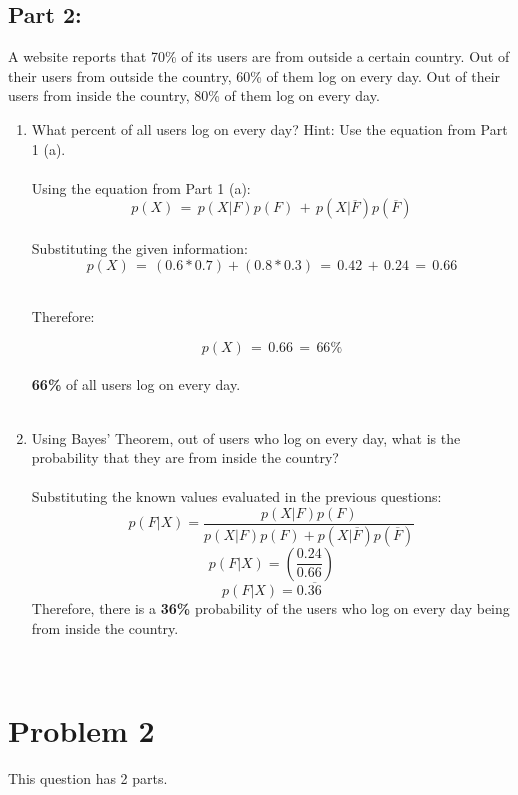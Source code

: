\documentclass{amsart}
\theoremstyle{definition}
\theoremstyle{Exercise}
\theoremstyle{remark}
\theoremstyle{rule}
\numberwithin{equation}{section}
\begin{document}
 \subsection*{Part 2:}
 A website reports that 70\% of its users are from outside a certain country. Out of their users from outside the country, 60\% of them log on every day. Out of their users from inside the country, 80\% of them log on every day.
 \\
 \begin{enumerate}[label=(\alph*)]
 \item What percent of all users log on every day? Hint: Use the equation from Part 1 (a).
 \\\\
 Using the equation from Part 1 (a):\\
 $$p(X)\,=\,p(X|F)p(F)\,+\,p(X|\overline{F})p(\overline{F})$$\\
 Substituting the given information:\\
 $$p(X)\,=\,(0.6 * 0.7) + (0.8 * 0.3)\,=\,0.42\,+\,0.24\,=\,0.66$$\\
 \begin{center}Therefore:\end{center}
 \vspace{0.1in}
 $$p(X)\,=\,0.66\,=\,66\%$$\\
 {\Large \bf 66\%} of all users log on every day.
 \\\\
 \item Using Bayes’ Theorem, out of users who log on every day, what is the probability that they are from inside the country?
 \\\\
 Substituting the known values evaluated in the previous questions:\\
 $$p(F|X)=\frac{p(X|F)p(F)}{p(X|F)p(F)+p(X|\overline{F})p(\overline{F})}$$
 $$p(F|X)=\left ( \frac{0.24}{0.66}\right )$$
 $$p(F|X)=0.\overline{36}$$
 Therefore, there is a {\Large \bf 36\%} probability of the users who log on every day being from inside the country.
 \end{enumerate}
\newpage

~\\
  \section*{Problem 2}
 \noindent
 This question has 2 parts.
\end{document}
